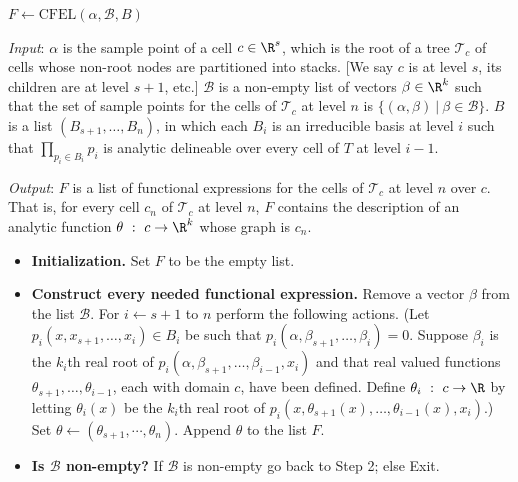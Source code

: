 \documentclass{article}
\begin{document}
\begin{algorithm}[!ht]
\caption{Construct Functional Expression List}

\medskip
\noindent
$F \leftarrow \mathrm{CFEL}(\alpha, \mathcal{B}, B)$

\medskip
\emph{Input}:
$\alpha$ is the sample point of a cell $c \in \R^s$,
which is the root of a tree $\mathcal{T}_c$ of cells whose non-root nodes
are partitioned into stacks.
[We say $c$ is at level $s$, its children are at level $s+1$, etc.]
$\mathcal{B}$ is a non-empty list of vectors $\beta \in \R^k$ such that
the set of sample points for the cells of $\mathcal{T}_c$ at level $n$ is
$\{(\alpha, \beta)~|~\beta \in \mathcal{B}\}$.
$B$ is a list $(B_{s+1}, \ldots, B_n)$, in which each $B_i$ is an irreducible basis at level $i$ such that 
$\prod_{p_{i} \in B_{i}} p_{i}$
is analytic delineable over every cell of $T$ at level $i-1$.

\medskip
\emph{Output}:
$F$ is a list of functional expressions for the cells of $\mathcal{T}_c$
at level $n$ over $c$. That is, for every cell $c_n$ of 
$\mathcal{T}_c$ at level $n$,
$F$ contains the description of an analytic function 
$\theta~:~c \rightarrow \R^k$ whose graph is $c_n$.

\medskip
\begin{itemize}
    \item[1.] \textbf{Initialization.} Set $F$ to be the empty list.

    \medskip
    \item[2.] \textbf{Construct every needed functional expression.}
    Remove a vector $\beta$ from the list $\mathcal{B}$.
    For $i \leftarrow s+1$ to $n$ perform the following actions.
    (Let $p_{i}(x, x_{s+1}, \ldots, x_i) \in B_i$ be such that
    $p_{i}(\alpha, \beta_{s+1}, \ldots, \beta_i) = 0$.
    Suppose $\beta_i$ is the $k_i$th real root of 
    $p_i(\alpha, \beta_{s+1}, \ldots, \beta_{i-1}, x_i)$ and
    that real valued functions 
    $\theta_{s+1}, \ldots, \theta_{i-1}$, each with domain $c$, have been defined. Define $\theta_i~:~c \rightarrow \R$ by letting
    $\theta_i(x)$ be the $k_i$th real root of
    $p_i(x, \theta_{s+1}(x), \ldots, \theta_{i-1}(x), x_i)$.)
    Set $\theta \leftarrow (\theta_{s+1}, \cdots, \theta_n)$.
    Append $\theta$ to the list $F$.

    \medskip
    \item[3.] \textbf{Is $\mathcal{B}$ non-empty?}
    If $\mathcal{B}$ is non-empty go back to Step 2; else Exit.
\end{itemize}
\end{algorithm}
\end{document}
